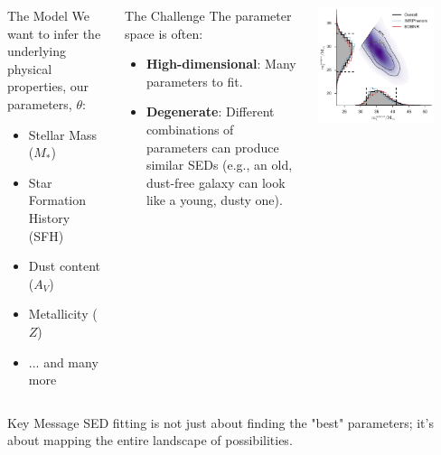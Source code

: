 \documentclass[aspectratio=169]{beamer}
\newcommand{\keyterm}[1]{\textbf{\textcolor{blue!70!black}{#1}}}
\begin{document}
\begin{frame}
\begin{columns}[T]
        \begin{block}{The Model}
            We want to infer the underlying physical properties, our parameters, $\theta$:
            \begin{itemize}
                \item Stellar Mass ($M_*$)
                \item Star Formation History (SFH)
                \item Dust content ($A_V$)
                \item Metallicity ($Z$)
                \item ... and many more
            \end{itemize}
        \end{block}
        \begin{block}{The Challenge}
            The parameter space is often:
            \begin{itemize}
                \item \keyterm{High-dimensional}: Many parameters to fit.
                \item \keyterm{Degenerate}: Different combinations of parameters can produce similar SEDs (e.g., an old, dust-free galaxy can look like a young, dusty one).
            \end{itemize}
        \end{block}
        \includegraphics[width=0.8\textwidth]{figures/ligo_m1_m2.pdf} %
    \end{columns}
    \vspace{1em}
    \begin{alertblock}{Key Message}
        SED fitting is not just about finding the "best" parameters; it's about mapping the entire landscape of possibilities.
    \end{alertblock}
\end{frame}
\end{document}
